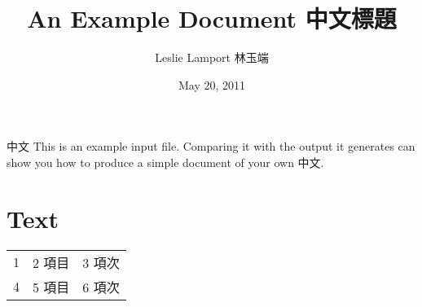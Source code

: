 \documentclass{article}      %
\title{An Example Document 中文標題}  %
\author{Leslie Lamport 林玉端}      %
\date{May 20, 2011}      %
\begin{document}

\maketitle                   %
中文
This is an example input file.  Comparing it with
the output it generates can show you how to
produce a simple document of your own 中文.

\section{Text}      %


	\centering
		\begin{tabular}{lcc}
      \hline 
			 1 & 2 項目& 3 項次\\
			 4 & 5 項目 & 6 項次\\
			\hline
		\end{tabular}
\end{document}
